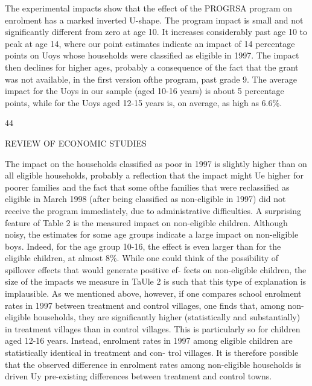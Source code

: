 The experimental impacts show that the effect of the PROGRSA program on enrolment has a marked inverted $\mathrm{U}$-shape. The program impact is small and not significantly different from zero at age 10. It increases considerably past age 10 to peak at age 14, where our point estimates indicate an impact of 14 percentage points on Uoys whose households were classified as eligible in 1997. The impact then declines for higher ages, probably a consequence of the fact that the grant was not available, in the first version ofthe program, past grade 9. The average impact for the Uoys in our sample (aged 10-16 years) is about 5 percentage points, while for the Uoys aged 12-15 years is, on average, as high as 6.6\%.

44

REVIEW OF ECONOMIC STUDIES

The impact on the households classified as poor in 1997 is slightly higher than on all eligible households, probably a reflection that the impact might Ue higher for poorer families and the fact that some ofthe families that were reclassified as eligible in March 1998 (after being classified as non-eligible in 1997) did not receive the program immediately, due to administrative difficulties. A surprising feature of Table 2 is the measured impact on non-eligible children. Although noisy, the estimates for some age groups indicate a large impact on non-eligible boys. Indeed, for the age group 10-16, the effect is even larger than for the eligible children, at almost 8\%. While one could think of the possibility of spillover effects that would generate positive ef- fects on non-eligible children, the size of the impacts we measure in TaUle 2 is such that this type of explanation is implausible. As we mentioned above, however, if one compares school enrolment rates in 1997 between treatment and control villages, one finds that, among non- eligible households, they are significantly higher (statistically and substantially) in treatment villages than in control villages. This is particularly so for children aged 12-16 years. Instead, enrolment rates in 1997 among eligible children are statistically identical in treatment and con- trol villages. It is therefore possible that the observed difference in enrolment rates among non-eligible households is driven Uy pre-existing differences between treatment and control towns.

